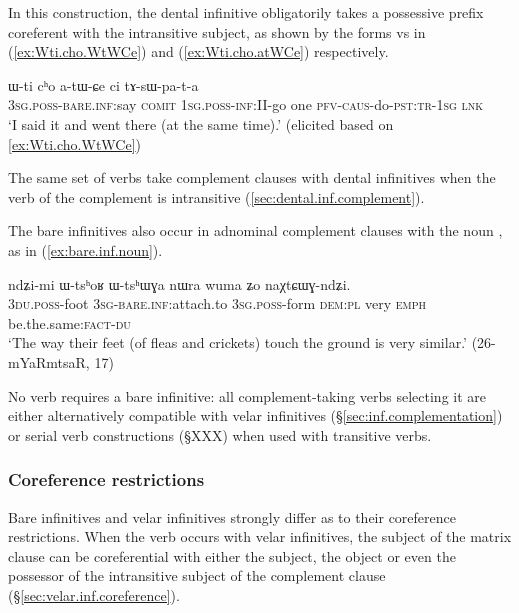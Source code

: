 In this construction, the dental infinitive obligatorily takes a possessive prefix coreferent with the intransitive subject, as shown by the forms  vs  in (\ref{ex:Wti.cho.WtWCe}) and (\ref{ex:Wti.cho.atWCe}) respectively.

\begin{exe} 
\ex \label{ex:Wti.cho.atWCe}
\gll   ɯ-ti cʰo a-tɯ-ɕe ci tɤ-sɯ-pa-t-a  \\
\textsc{3sg}.\textsc{poss}-\textsc{bare}.\textsc{inf}:say \textsc{comit} \textsc{1sg}.\textsc{poss}-\textsc{inf:II}-go  one  \textsc{pfv}-\textsc{caus}-do-\textsc{pst}:\textsc{tr}-\textsc{1sg} \textsc{lnk} \\
\glt `I said it and went there (at the same time).' (elicited based on \ref{ex:Wti.cho.WtWCe})
\end{exe} 

The same set of verbs take complement clauses with dental infinitives when the verb of the complement is intransitive (\ref{sec:dental.inf.complement}).

The bare infinitives also occur in adnominal complement clauses with the noun , as in (\ref{ex:bare.inf.noun}).

\begin{exe}
\ex \label{ex:bare.inf.noun}
\gll ndʑi-mi ɯ-tsʰoʁ ɯ-tsʰɯɣa nɯra wuma ʑo naχtɕɯɣ-ndʑi.   \\
\textsc{3du.poss}-foot \textsc{3sg}-\textsc{bare.inf:}attach.to \textsc{3sg.poss}-form \textsc{dem:pl} very \textsc{emph} be.the.same:\textsc{fact}-\textsc{du}  \\
\glt `The way their feet (of fleas and crickets) touch the ground is very similar.' (26-mYaRmtsaR, 17)
\end{exe}

No verb requires a bare infinitive: all complement-taking verbs selecting it are either alternatively compatible with velar infinitives (§\ref{sec:inf.complementation}) or serial verb constructions (§XXX) when used with transitive verbs.



\subsubsection{Coreference restrictions} \label{sec:bare.inf.coreference}
Bare infinitives and velar infinitives strongly differ as to their coreference restrictions. When the verb  occurs with velar infinitives, the subject of the matrix clause can be coreferential with either the subject, the object or even the possessor of the intransitive subject of the complement clause (§\ref{sec:velar.inf.coreference}).

